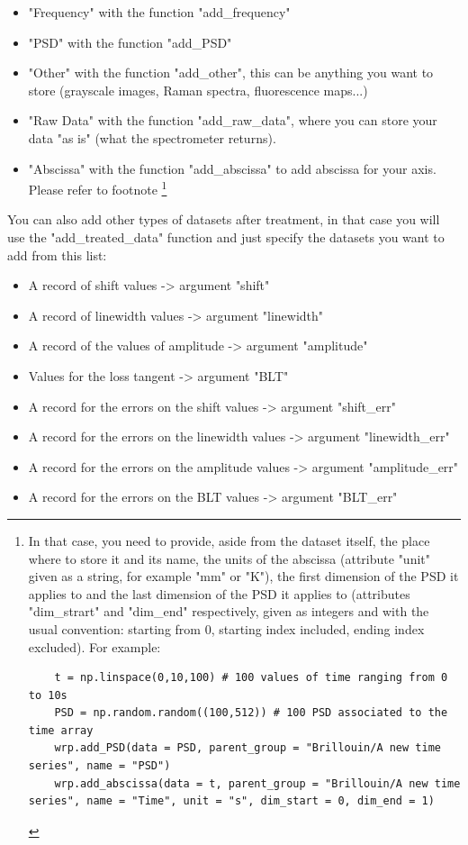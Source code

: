 \documentclass{article}
\begin{document}
\begin{itemize}
    \item "Frequency" with the function "add\_frequency"
    \item "PSD" with the function "add\_PSD"
    \item "Other" with the function "add\_other", this can be anything you want to store (grayscale images, Raman spectra, fluorescence maps...)
    \item "Raw Data" with the function "add\_raw\_data", where you can store your data "as is" (what the spectrometer returns).
    \item "Abscissa" with the function "add\_abscissa" to add abscissa for your axis. Please refer to footnote \cprotect\footnote{In that case, you need to provide, aside from the dataset itself, the place where to store it and its name, the units of the abscissa (attribute "unit" given as a string, for example "mm" or "K"), the first dimension of the PSD it applies to and the last dimension of the PSD it applies to (attributes "dim\_strart" and "dim\_end" respectively, given as integers and with the usual convention: starting from 0, starting index included, ending index excluded). For example:
\begin{lstlisting}
    t = np.linspace(0,10,100) # 100 values of time ranging from 0 to 10s
    PSD = np.random.random((100,512)) # 100 PSD associated to the time array
    wrp.add_PSD(data = PSD, parent_group = "Brillouin/A new time series", name = "PSD")
    wrp.add_abscissa(data = t, parent_group = "Brillouin/A new time series", name = "Time", unit = "s", dim_start = 0, dim_end = 1)
\end{lstlisting}}
\end{itemize}

You can also add other types of datasets after treatment, in that case you will use the "add\_treated\_data" function and just specify the datasets you want to add from this list:
\begin{itemize}
    \item A record of shift values -> argument "shift"
    \item A record of linewidth values -> argument "linewidth"
    \item A record of the values of amplitude -> argument "amplitude"
    \item Values for the loss tangent -> argument "BLT" 
    \item A record for the errors on the shift values -> argument "shift\_err"
    \item A record for the errors on the linewidth values -> argument "linewidth\_err"
    \item A record for the errors on the amplitude values -> argument "amplitude\_err"
    \item A record for the errors on the BLT values -> argument "BLT\_err"
\end{itemize}
\end{document}
